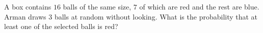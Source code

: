 A box contains $16$ balls of the same size, $7$ of which are red and the rest are blue. Arman draws $3$ balls at random without looking. What is the probability that at least one of the selected balls is red?
